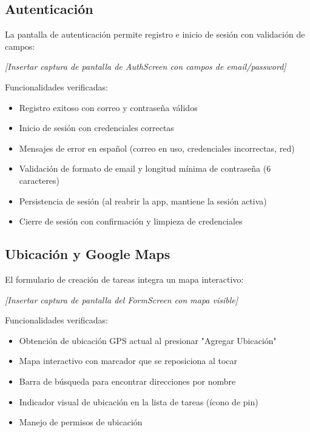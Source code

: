 \documentclass[12pt,a4paper]{article}
\begin{document}
\subsection{Autenticación}

La pantalla de autenticación permite registro e inicio de sesión con validación de campos:

\begin{center}
    \textit{[Insertar captura de pantalla de AuthScreen con campos de email/password]}
\end{center}

Funcionalidades verificadas:
\begin{itemize}
    \item Registro exitoso con correo y contraseña válidos
    \item Inicio de sesión con credenciales correctas
    \item Mensajes de error en español (correo en uso, credenciales incorrectas, red)
    \item Validación de formato de email y longitud mínima de contraseña (6 caracteres)
    \item Persistencia de sesión (al reabrir la app, mantiene la sesión activa)
    \item Cierre de sesión con confirmación y limpieza de credenciales
\end{itemize}

\subsection{Ubicación y Google Maps}

El formulario de creación de tareas integra un mapa interactivo:

\begin{center}
    \textit{[Insertar captura de pantalla del FormScreen con mapa visible]}
\end{center}

Funcionalidades verificadas:
\begin{itemize}
    \item Obtención de ubicación GPS actual al presionar "Agregar Ubicación"
    \item Mapa interactivo con marcador que se reposiciona al tocar
    \item Barra de búsqueda para encontrar direcciones por nombre
    \item Indicador visual de ubicación en la lista de tareas (ícono de pin)
    \item Manejo de permisos de ubicación
\end{itemize}
\end{document}
